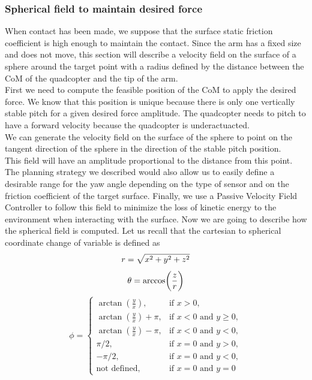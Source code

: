 \subsubsection{Spherical field to maintain desired force }
When contact has been made, we suppose that the surface static friction coefficient is high enough to maintain the contact.
Since the arm has a fixed size and does not move, this section will describe a velocity field on the surface of a sphere around the target point with a radius defined by the distance between the CoM of the quadcopter and the tip of the arm.\\
First we need to compute the feasible position of the CoM to apply the desired force. 
We know that this position is unique because there is only one vertically stable pitch for a given desired force amplitude. The quadcopter needs to pitch to have a forward velocity because the quadcopter is underactuacted.\\
We can generate the velocity field on the surface of the sphere to point on the tangent direction of the sphere in the direction of the stable pitch position. \\
This field will have an amplitude proportional to the distance from this point.
The planning strategy we described would also allow us to easily define a desirable range for the yaw angle depending on the type of sensor and on the friction coefficient of the target surface.
Finally, we use a Passive Velocity Field Controller \cite{li1999passive} to follow this field to minimize the loss of kinetic energy to the environment when interacting with the surface.
Now we are going to describe how the spherical field is computed. 
Let us recall that the cartesian to spherical coordinate change of variable is defined as
\begin{equation} 
    r = \sqrt{x^2+y^2+z^2}\\ \nonumber 
\end{equation}
\begin{equation}
    \theta = \arccos(\frac{z}{r})\\\nonumber 
\end{equation}
\begin{equation}
    \label{transformation}
    \phi =
    \begin{cases}
        \arctan(\frac{y}{x}), & \text{if $x>0$},\\
        \arctan(\frac{y}{x}) + \pi, & \text{if $x<0$ and $y\geq 0$},\\
        \arctan(\frac{y}{x}) - \pi, & \text{if $x<0$ and $y<0$},\\
        \pi/2, & \text{if $x=0$ and $y>0$},\\
        -\pi/2, & \text{if $x=0$ and $y<0$},\\
        \text{not defined} , & \text{if $x=0$ and $y=0$}
    \end{cases}       
\end{equation}  
